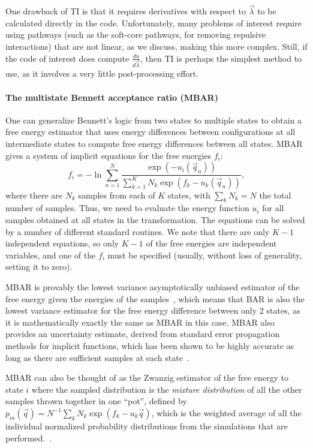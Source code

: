 \documentclass[9pt,bestpractices]{livecoms}
\begin{document}
One drawback of TI is that it requires derivatives with respect to $\vec{\lambda}$ to be calculated directly in the code. Unfortunately, many problems of interest require using pathways (such as the soft-core pathways, for removing repulsive interactions) that are not linear, as we discuss, making this more complex. Still, if the code of interest does compute $\frac{du}{d\vec{\lambda}}$, then TI is perhaps the simplest method to use, as it involves a very little post-processing effort.

\paragraph{The multistate Bennett acceptance ratio (MBAR)}
One can generalize Bennett's logic from two states to multiple states to obtain a free energy estimator that uses energy differences between configurations at all intermediate states to compute free energy differences between all states. MBAR gives a system of implicit equations for the free energies $f_i$:
\begin{equation}
f_i = - \ln \sum_{n=1}^{N} \frac{\exp(-u_i(\vec{q}_n))}{\sum_{k=1}^K N_k \exp(f_k-u_k(\vec{q}_n))},
\end{equation}
where there are $N_k$ samples from each of $K$ states, with $\sum_k N_k=N$ the total number of samples. Thus, we need to evaluate the energy function $u_i$ for all samples obtained at all states in the transformation. The equations can be solved by a number of different standard routines. We note that there are only $K-1$ independent equations, so only $K-1$ of the free energies are independent variables, and one of the $f_i$ must be specified (usually, without loss of generality, setting it to zero).

MBAR is provably the lowest variance asymptotically unbiased estimator of the free energy given the energies of the samples~\cite{tan2004likelihood}, which means that BAR is also the lowest variance estimator for the free energy difference between only 2 states, as it is mathematically exactly the same as MBAR in this case. MBAR also provides an uncertainty estimate, derived from standard error propagation methods for implicit functions, which has been shown to be highly accurate as long as there are sufficient samples at each state~\cite{paliwal2011benchmark}.

MBAR can also be thought of as the Zwanzig estimator of the free energy to state $i$ where the sampled distribution is the \textit{mixture distribution} of all the other samples thrown together in one ``pot'', defined by $p_m(\vec{q}) = N^{-1} \sum_k N_k \exp(f_k-u_k\vec{q})$, which is the weighted average of all the individual normalized probability distributions from the simulations that are performed.~\cite{shirts2017reweighting}.
\end{document}
